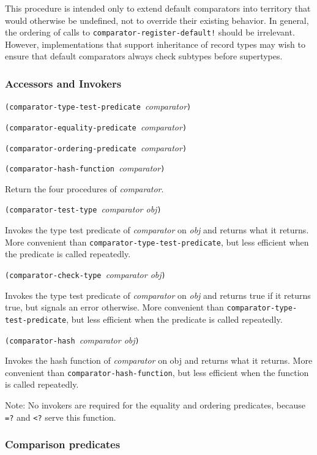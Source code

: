 This procedure is intended only to extend default comparators into
territory that would otherwise be undefined, not to override their
existing behavior. In general, the ordering of calls to
\texttt{comparator-register-default!} should be irrelevant. However,
implementations that support inheritance of record types may wish to
ensure that default comparators always check subtypes before supertypes.

\hypertarget{Accessorsandinvokers}{\subsubsection{Accessors and
Invokers}\label{Accessorsandinvokers}}

\texttt{(comparator-type-test-predicate\ }\emph{comparator}\texttt{)}

\texttt{(comparator-equality-predicate\ }\emph{comparator}\texttt{)}

\texttt{(comparator-ordering-predicate\ }\emph{comparator}\texttt{)}

\texttt{(comparator-hash-function\ }\emph{comparator}\texttt{)}

Return the four procedures of \emph{comparator}.

\texttt{(comparator-test-type\ }\emph{comparator obj}\texttt{)}

Invokes the type test predicate of \emph{comparator} on \emph{obj} and
returns what it returns. More convenient than
\texttt{comparator-type-test-predicate}, but less efficient when the
predicate is called repeatedly.

\texttt{(comparator-check-type\ }\emph{comparator obj}\texttt{)}

Invokes the type test predicate of \emph{comparator} on \emph{obj} and
returns true if it returns true, but signals an error otherwise. More
convenient than \texttt{comparator-type-test-predicate}, but less
efficient when the predicate is called repeatedly.

\texttt{(comparator-hash\ }\emph{comparator obj}\texttt{)}

Invokes the hash function of \emph{comparator} on obj and returns what
it returns. More convenient than \texttt{comparator-hash-function}, but
less efficient when the function is called repeatedly.

Note: No invokers are required for the equality and ordering predicates,
because \texttt{=?} and \texttt{\textless{}?} serve this function.

\hypertarget{Comparisonpredicates}{\subsubsection{Comparison
predicates}\label{Comparisonpredicates}}

